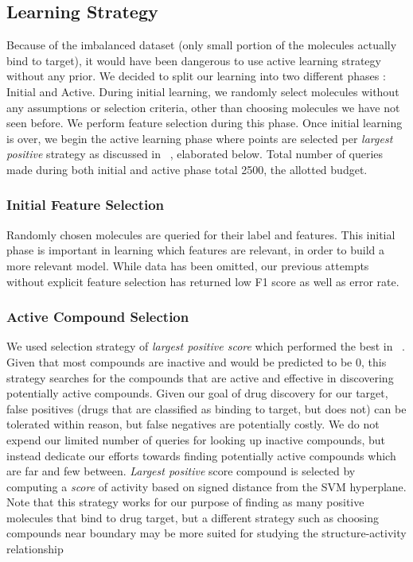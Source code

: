 \documentclass[paper=a4, fontsize=11pt]{scrartcl}
\numberwithin{equation}{section}    %
\numberwithin{figure}{section}      %
\numberwithin{table}{section}       %
\numberwithin{equation}{section}    %
\numberwithin{figure}{section}      %
\numberwithin{table}{section}       %
\begin{document}
\subsection{Learning Strategy}

Because of the imbalanced dataset (only small portion of the molecules actually bind to target), it would have been dangerous to use active learning strategy without any prior. We decided to split our learning into two different phases : Initial and Active. During initial learning, we randomly select molecules without any assumptions or selection criteria, other than choosing molecules we have not seen before. We perform feature selection during this phase. Once initial learning is over, we begin the active learning phase where points are selected per \textit{largest positive} strategy as discussed in ~\cite{ref:warmuth}, elaborated below. Total number of queries made during both initial and active phase total 2500, the allotted budget. 


\subsubsection{Initial Feature Selection}

Randomly chosen molecules are queried for their label and features. This initial phase is important in learning which features are relevant, in order to build a more relevant model. While data has been omitted, our previous attempts without explicit feature selection has returned low F1 score as well as error rate. 

\subsubsection{Active Compound Selection}

We used selection strategy of \textit{largest positive score} which performed the best in ~\cite{ref:warmuth}. Given that most compounds are inactive and would be predicted to be 0, this strategy searches for the compounds that are active and effective in discovering potentially active compounds. Given our goal of drug discovery for our target, false positives (drugs that are classified as binding to target, but does not) can be tolerated within reason, but false negatives are potentially costly. We do not expend our limited number of queries for looking up inactive compounds, but instead dedicate our efforts towards finding potentially active compounds which are far and few between. \textit{Largest positive} score compound is selected by computing a \textit{score} of activity based on signed distance from the SVM hyperplane. Note that this strategy works for our purpose of finding as many positive molecules that bind to drug target, but a different strategy such as choosing compounds near boundary may be more suited for studying the structure-activity relationship ~\cite{ref:warmuth}
\end{document}
